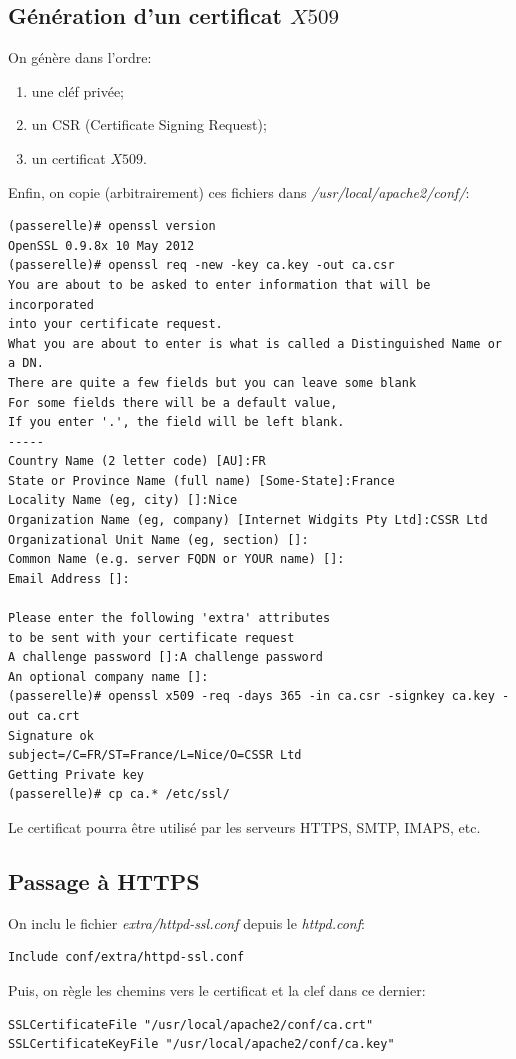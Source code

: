 \documentclass[a4paper]{article}
\begin{document}
\subsection{Génération d'un certificat $X509$}
On génère dans l'ordre:
\begin{enumerate}
	\item une cléf privée;
	\item un CSR (Certificate Signing Request);
	\item un certificat $X509$.
\end{enumerate}

Enfin, on copie (arbitrairement) ces fichiers dans
\textit{/usr/local/apache2/conf/}:
\begin{verbatim}
(passerelle)# openssl version
OpenSSL 0.9.8x 10 May 2012
(passerelle)# openssl req -new -key ca.key -out ca.csr
You are about to be asked to enter information that will be incorporated
into your certificate request.
What you are about to enter is what is called a Distinguished Name or a DN.
There are quite a few fields but you can leave some blank
For some fields there will be a default value,
If you enter '.', the field will be left blank.
-----
Country Name (2 letter code) [AU]:FR
State or Province Name (full name) [Some-State]:France
Locality Name (eg, city) []:Nice
Organization Name (eg, company) [Internet Widgits Pty Ltd]:CSSR Ltd
Organizational Unit Name (eg, section) []:
Common Name (e.g. server FQDN or YOUR name) []:
Email Address []:

Please enter the following 'extra' attributes
to be sent with your certificate request
A challenge password []:A challenge password
An optional company name []:
(passerelle)# openssl x509 -req -days 365 -in ca.csr -signkey ca.key -out ca.crt
Signature ok
subject=/C=FR/ST=France/L=Nice/O=CSSR Ltd
Getting Private key
(passerelle)# cp ca.* /etc/ssl/
\end{verbatim}

Le certificat pourra être utilisé par les serveurs HTTPS, SMTP, IMAPS, etc.

\subsection{Passage à HTTPS}
On inclu le fichier \textit{extra/httpd-ssl.conf} depuis le
\textit{httpd.conf}:
\begin{verbatim}
Include conf/extra/httpd-ssl.conf
\end{verbatim}

Puis, on règle les chemins vers le certificat et la clef dans ce
dernier:
\begin{verbatim}
SSLCertificateFile "/usr/local/apache2/conf/ca.crt"
SSLCertificateKeyFile "/usr/local/apache2/conf/ca.key"
\end{verbatim}
\end{document}

